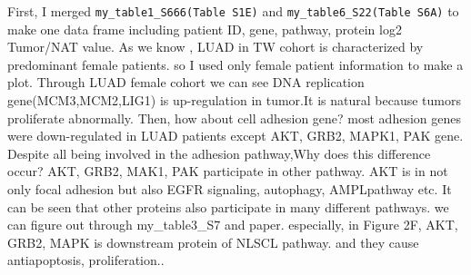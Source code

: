 \documentclass[
]{article}
\begin{document}
First, I merged \texttt{my\_table1\_S666(Table\ S1E)} and
\texttt{my\_table6\_S22(Table\ S6A)} to make one data frame including
patient ID, gene, pathway, protein log2 Tumor/NAT value. As we know ,
LUAD in TW cohort is characterized by predominant female patients. so I
used only female patient information to make a plot. Through LUAD female
cohort we can see DNA replication gene(MCM3,MCM2,LIG1) is up-regulation
in tumor.It is natural because tumors proliferate abnormally. Then, how
about cell adhesion gene? most adhesion genes were down-regulated in
LUAD patients except AKT, GRB2, MAPK1, PAK gene. Despite all being
involved in the adhesion pathway,Why does this difference occur? AKT,
GRB2, MAK1, PAK participate in other pathway. AKT is in not only focal
adhesion but also EGFR signaling, autophagy, AMPLpathway etc. It can be
seen that other proteins also participate in many different pathways. we
can figure out through my\_table3\_S7 and paper. especially, in Figure
2F, AKT, GRB2, MAPK is downstream protein of NLSCL pathway. and they
cause antiapoptosis, proliferation..
\end{document}
